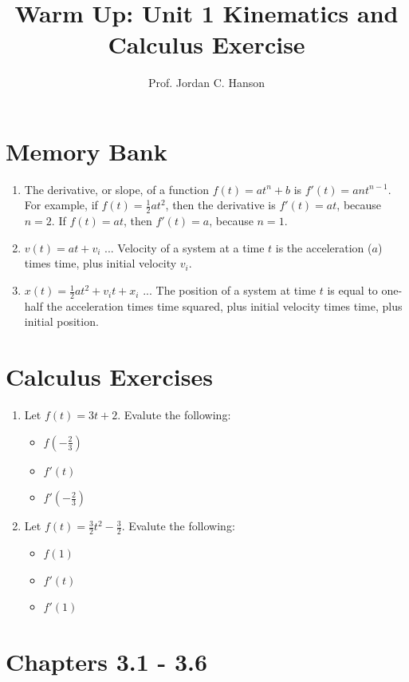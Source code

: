 \documentclass{article}
\begin{document}
\title{Warm Up: Unit 1 Kinematics and Calculus Exercise}
\author{Prof. Jordan C. Hanson}
\maketitle

\section{Memory Bank}

\begin{enumerate}
\item The derivative, or slope, of a function $f(t) = a t^n + b$ is $f'(t) = a n t^{n-1}$.  For example, if $f(t) = \frac{1}{2} a t^2$, then the derivative is $f'(t) = a t$, because $n = 2$.  If $f(t) = at$, then $f'(t) = a$, because $n=1$.
\item $v(t) = a t + v_i$ ... Velocity of a system at a time $t$ is the acceleration ($a$) times time, plus initial velocity $v_i$.
\item $x(t) = \frac{1}{2}a t^2 + v_i t + x_i$ ... The position of a system at time $t$ is equal to one-half the acceleration times time squared, plus initial velocity times time, plus initial position.
\end{enumerate}

\section{Calculus Exercises}

\begin{enumerate}
\item Let $f(t) = 3 t + 2$.  Evalute the following:
\begin{itemize}
\item $f(-\frac{2}{3})$
\item $f'(t)$
\item $f'(-\frac{2}{3})$
\end{itemize}
\item Let $f(t) = \frac{3}{2} t^2 - \frac{3}{2}$.  Evalute the following:
\begin{itemize}
\item $f(1)$
\item $f'(t)$
\item $f'(1)$
\end{itemize}
\end{enumerate}

\section{Chapters 3.1 - 3.6}
\end{document}
